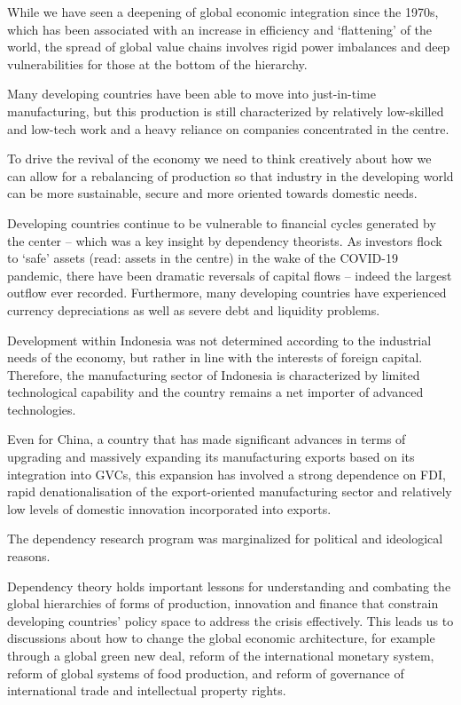 \documentclass[
]{book}
\begin{document}
While we have seen a deepening of global economic integration since the 1970s, which has been associated with an increase in efficiency and `flattening' of the world, the spread of global value chains involves rigid power imbalances and deep vulnerabilities for those at the bottom of the hierarchy.

Many developing countries have been able to move into just-in-time manufacturing, but this production is still characterized by relatively low-skilled and low-tech work and a heavy reliance on companies concentrated in the centre.

To drive the revival of the economy we need to think creatively about how we can allow for a rebalancing of production so that industry in the developing world can be more sustainable, secure and more oriented towards domestic needs.

Developing countries continue to be vulnerable to financial cycles generated by the center -- which was a key insight by dependency theorists. As investors flock to `safe' assets (read: assets in the centre) in the wake of the COVID-19 pandemic, there have been dramatic reversals of capital flows -- indeed the largest outflow ever recorded. Furthermore, many developing countries have experienced currency depreciations as well as severe debt and liquidity problems.

Development within Indonesia was not determined according to the industrial needs of the economy, but rather in line with the interests of foreign capital. Therefore, the manufacturing sector of Indonesia is characterized by limited technological capability and the country remains a net importer of advanced technologies.

Even for China, a country that has made significant advances in terms of upgrading and massively expanding its manufacturing exports based on its integration into GVCs, this expansion has involved a strong dependence on FDI, rapid denationalisation of the export-oriented manufacturing sector and relatively low levels of domestic innovation incorporated into exports.

The dependency research program was marginalized for political and ideological reasons.

Dependency theory holds important lessons for understanding and combating the global hierarchies of forms of production, innovation and finance that constrain developing countries' policy space to address the crisis effectively. This leads us to discussions about how to change the global economic architecture, for example through a global green new deal, reform of the international monetary system, reform of global systems of food production, and reform of governance of international trade and intellectual property rights.
\end{document}
